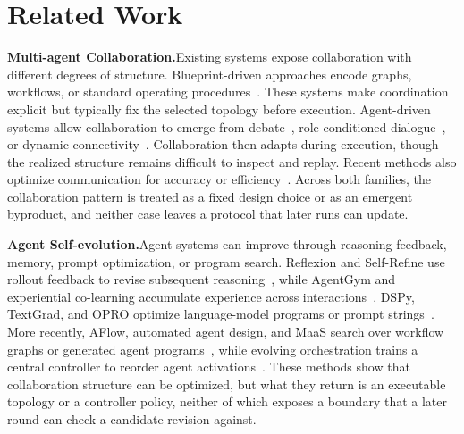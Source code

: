 \documentclass{article} %
\begin{document}
\section{Related Work}

\textbf{Multi-agent Collaboration.}\quad Existing systems expose collaboration with different degrees of structure. Blueprint-driven approaches encode graphs, workflows, or standard operating procedures~\citep{hong2024metagptmetaprogrammingmultiagent,qian2024chatdevcommunicativeagentssoftware,wu2023autogenenablingnextgenllm}. These systems make coordination explicit but typically fix the selected topology before execution. Agent-driven systems allow collaboration to emerge from debate~\citep{du2023improvingfactualityreasoninglanguage,liang2023encouragingdivergentthinking}, role-conditioned dialogue~\citep{li2023camelcommunicativeagentsmind,chan2023chateval}, or dynamic connectivity~\citep{liu2024dynamicllmpoweredagentnetwork,zhang2024chainagentslargelanguage}. Collaboration then adapts during execution, though the realized structure remains difficult to inspect and replay. Recent methods also optimize communication for accuracy or efficiency~\citep{sun2023corex,chen2024reconcileroundtableconferenceimproves,chen2024optima}. Across both families, the collaboration pattern is treated as a fixed design choice or as an emergent byproduct, and neither case leaves a protocol that later runs can update.

\textbf{Agent Self-evolution.}\quad Agent systems can improve through reasoning feedback, memory, prompt optimization, or program search. Reflexion and Self-Refine use rollout feedback to revise subsequent reasoning~\citep{shinn2023reflexion,madaan2023selfrefine}, while AgentGym and experiential co-learning accumulate experience across interactions~\citep{xi2024agentgym,qian2023experientialcolearning}. DSPy, TextGrad, and OPRO optimize language-model programs or prompt strings~\citep{khattab2024dspy,yuksekgonul2024textgrad,yang2024large}. More recently, AFlow, automated agent design, and MaaS search over workflow graphs or generated agent programs~\citep{zhang2025aflowautomatingagenticworkflow,hu2025automateddesignagenticsystems,zhang2025maasagenticsupernet}, while evolving orchestration trains a central controller to reorder agent activations~\citep{dang2025puppeteer}. These methods show that collaboration structure can be optimized, but what they return is an executable topology or a controller policy, neither of which exposes a boundary that a later round can check a candidate revision against.
\end{document}
